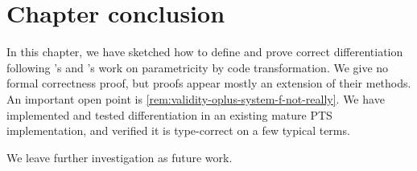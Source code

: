 





\section{Chapter conclusion}
In this chapter, we have sketched how to define and prove correct
differentiation following \citet{Bernardy2011realizability}'s and
\citet{Bernardy10}'s work on
parametricity by code transformation. We give no formal correctness proof, but
proofs appear mostly an extension of their methods. An important open point is
\cref{rem:validity-oplus-system-f-not-really}.
We have implemented and tested differentiation in an existing mature PTS
implementation, and verified it is type-correct on a few typical terms.

We leave further investigation as future work.

